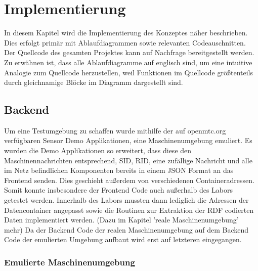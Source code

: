 \documentclass[
	12pt,								%
	DIV10,
	a4paper,         		%
	oneside,						%
	parskip=half,				%
	headings=normal,			%
	listof=totoc,					%
	bibliography=totoc,						%
	index=totoc,						%
	final								%
]{scrartcl}
\begin{document}
\section{Implementierung}
In diesem Kapitel wird die Implementierung des Konzeptes näher beschrieben. Dies erfolgt primär mit Ablaufdiagrammen sowie relevanten Codeauschnitten. Der Quellcode des gesamten Projektes kann auf Nachfrage bereitgestellt werden. Zu erwähnen ist, dass alle Ablaufdiagramme auf englisch sind, um eine intuitive Analogie zum Quellcode herzustellen, weil Funktionen im Quellcode größtenteils durch gleichnamige Blöcke im Diagramm dargestellt sind.
\subsection{Backend}
Um eine Testumgebung zu schaffen wurde mithilfe der auf openmtc.org verfügbaren Sensor Demo Applikationen, eine Maschinenumgebung emuliert. Es wurden die Demo Applikationen so erweitert, dass diese den Maschinennachrichten entsprechend, SID, RID, eine zufällige Nachricht und alle im Netz befindlichen Komponenten bereits in einem JSON Format an das Frontend senden. Dies geschieht außerdem von verschiedenen Containeradressen. Somit konnte insbesondere der Frontend Code auch außerhalb des Labors getestet werden. 
Innerhalb des Labors mussten dann lediglich die Adressen der Datencontainer angepasst sowie die Routinen zur Extraktion der RDF codierten Daten implementiert werden. (Dazu im Kapitel 'reale Maschinenumgebung' mehr) 
Da der Backend Code der realen Maschinenumgebung auf dem Backend Code der emulierten Umgebung aufbaut wird erst auf letzteren eingegangen. 
\newpage
\subsubsection{Emulierte Maschinenumgebung}
\end{document}
